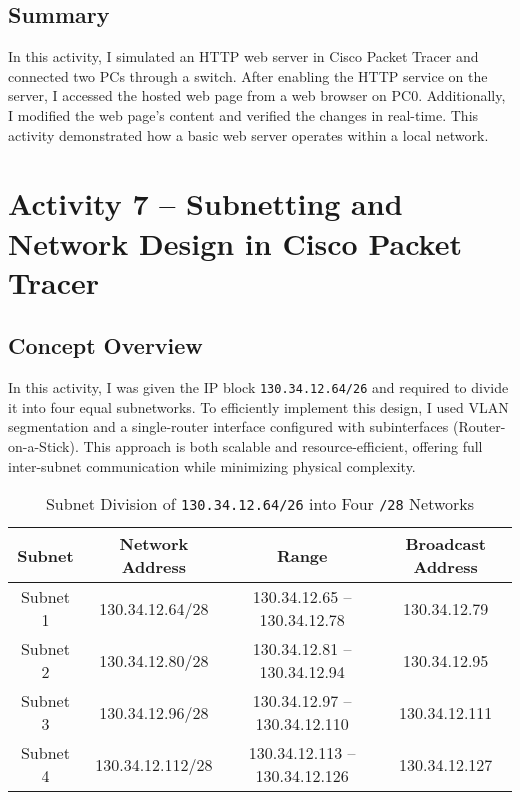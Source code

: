 \documentclass[11pt,a4paper]{article}
\begin{document}
\subsection{Summary}
In this activity, I simulated an HTTP web server in Cisco Packet Tracer and connected two PCs through a switch. After enabling the HTTP service on the server, I accessed the hosted web page from a web browser on PC0. Additionally, I modified the web page’s content and verified the changes in real-time. This activity demonstrated how a basic web server operates within a local network.

\section{Activity 7 – Subnetting and Network Design in Cisco Packet Tracer}

\subsection{Concept Overview}
In this activity, I was given the IP block \texttt{130.34.12.64/26} and required to divide it into four equal subnetworks. To efficiently implement this design, I used VLAN segmentation and a single-router interface configured with subinterfaces (Router-on-a-Stick). This approach is both scalable and resource-efficient, offering full inter-subnet communication while minimizing physical complexity.

\begin{table}[h!]
\centering
\begin{tabular}{|c|c|c|c|}
\hline
\textbf{Subnet} & \textbf{Network Address} & \textbf{Range} & \textbf{Broadcast Address} \\
\hline
Subnet 1 & 130.34.12.64/28 & 130.34.12.65 – 130.34.12.78 & 130.34.12.79 \\
Subnet 2 & 130.34.12.80/28 & 130.34.12.81 – 130.34.12.94 & 130.34.12.95 \\
Subnet 3 & 130.34.12.96/28 & 130.34.12.97 – 130.34.12.110 & 130.34.12.111 \\
Subnet 4 & 130.34.12.112/28 & 130.34.12.113 – 130.34.12.126 & 130.34.12.127 \\
\hline
\end{tabular}
\vspace{0.5em}
\captionsetup{justification=centering}
\caption{Subnet Division of \texttt{130.34.12.64/26} into Four \texttt{/28} Networks}
\end{table}
\end{document}
